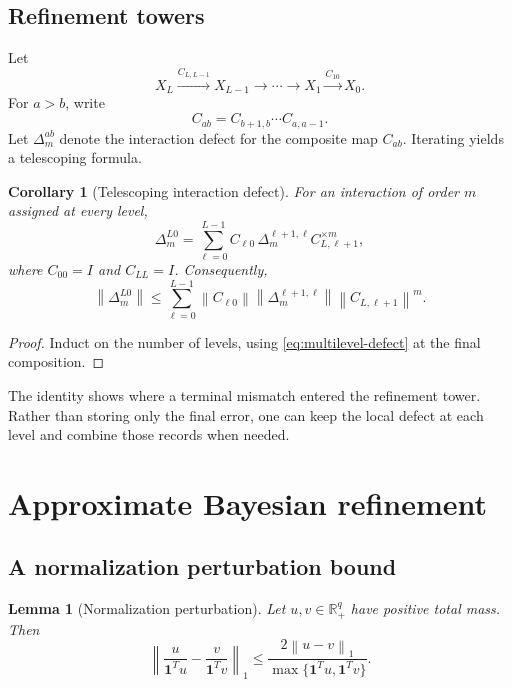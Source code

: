 \documentclass[11pt]{article}
\newtheorem{lemma}[theorem]{Lemma}
\newtheorem{corollary}[theorem]{Corollary}
\theoremstyle{definition}
\theoremstyle{remark}
\newcommand{\R}{\mathbb R}
\newcommand{\norm}[1]{\left\lVert #1\right\rVert}
\newcommand{\one}{\mathbf 1}
\begin{document}
\subsection{Refinement towers}
Let
\[
  X_L\xrightarrow{C_{L,L-1}}X_{L-1}
  \longrightarrow\cdots\longrightarrow
  X_1\xrightarrow{C_{10}}X_0.
\]
For $a>b$, write
\[
  C_{ab}=C_{b+1,b}\cdots C_{a,a-1}.
\]
Let $\Delta_m^{ab}$ denote the interaction defect for the composite map $C_{ab}$.  Iterating  yields a telescoping formula.

\begin{corollary}[Telescoping interaction defect]\label{cor:tower-defect}
For an interaction of order $m$ assigned at every level,
\begin{equation}\label{eq:tower-defect}
  \Delta_m^{L0}
  =
  \sum_{\ell=0}^{L-1}
  C_{\ell0}\,
  \Delta_m^{\ell+1,\ell}
  C_{L,\ell+1}^{\times m},
\end{equation}
where $C_{00}=I$ and $C_{LL}=I$.  Consequently,
\begin{equation}\label{eq:tower-defect-bound}
  \norm{\Delta_m^{L0}}
  \leq
  \sum_{\ell=0}^{L-1}
  \norm{C_{\ell0}}
  \norm{\Delta_m^{\ell+1,\ell}}
  \norm{C_{L,\ell+1}}^m.
\end{equation}
\end{corollary}

\begin{proof}
Induct on the number of levels, using \eqref{eq:multilevel-defect} at the final composition.
\end{proof}

The identity shows where a terminal mismatch entered the refinement tower.  Rather than storing only the final error, one can keep the local defect at each level and combine those records when needed.

\section{Approximate Bayesian refinement}\label{sec:approx-bayes}

\subsection{A normalization perturbation bound}

\begin{lemma}[Normalization perturbation]\label{lem:normalization-perturbation}
Let $u,v\in\R_+^q$ have positive total mass.  Then
\begin{equation}\label{eq:normalization-perturbation}
  \boxed{
  \norm{
  \frac{u}{\one^Tu}
  -
  \frac{v}{\one^Tv}
  }_1
  \leq
  \frac{2\norm{u-v}_1}
  {\max\{\one^Tu,\one^Tv\}}.}
\end{equation}
\end{lemma}
\end{document}
